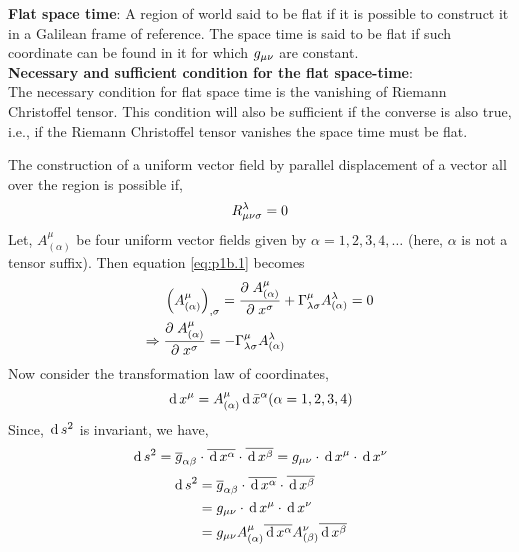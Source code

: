 \documentclass[../main-sheet.tex]{subfiles}
\begin{document}
        \begin{soln}
            \textbf{Flat space time}: A region of world said to be flat if it is possible to construct it in a Galilean frame of reference. The space time is said to be flat if such coordinate can be found in it for which \(g_{\mu\nu}\) are constant.\\

            \textbf{Necessary and sufficient condition for the flat space-time}:\\
            The necessary condition for flat space time is the vanishing of Riemann Christoffel tensor. This condition will also be sufficient if the converse is also true, i.e., if the Riemann Christoffel tensor vanishes the space time must be flat.

            The construction of a uniform vector field by parallel displacement of a vector all over the region is possible if,
            \begin{equation}
                R_{{\mu\nu}\sigma}^\lambda=0\label{eq:p1b.1}
            \end{equation}
            Let, \(A_{(\alpha)}^\mu\) be four uniform vector fields given by \(\alpha=1,2,3,4,\dots\) (here, \(\alpha\) is not a tensor suffix). Then equation \eqref{eq:p1b.1} becomes
            \begin{align}
                & \left( A_{(\alpha)}^\mu \right)_{,\sigma}=\frac{\partial\;A_{(\alpha)}^\mu}{\partial\; x^\sigma}+\Gamma_{\lambda\sigma}^\mu  A_{(\alpha)}^\lambda=0\notag\\
                \Rightarrow\;& \frac{\partial\;A_{(\alpha)}^\mu}{\partial\; x^\sigma}=-\Gamma_{\lambda\sigma}^\mu  A_{(\alpha)}^\lambda\label{eq:1b1.2}
            \end{align}
            Now consider the transformation law of coordinates,
            \[\,\mathrm{d}\, x^\mu=A_{(\alpha)}^\mu\,\mathrm{d}\, \bar{x}^\alpha (\alpha=1,2,3,4)\]
            Since, \(\,\mathrm{d}\, s^2\) is invariant, we have,
            \[
                \,\mathrm{d}\, s^2=\overline{g}_{\alpha\beta} \cdot\overline{\,\mathrm{d}\, x^\alpha}\cdot\overline{\,\mathrm{d}\, x^\beta}=g_{{\mu\nu}} \cdot \,\mathrm{d}\, x^\mu\cdot\,\mathrm{d}\, x^\nu\\
            \]
            \begin{align*}
                \,\mathrm{d}\, s^2&=\overline{g}_{\alpha\beta} \cdot\overline{\,\mathrm{d}\, x^\alpha}\cdot\overline{\,\mathrm{d}\, x^\beta}\\
                &=g_{{\mu\nu}} \cdot \,\mathrm{d}\, x^\mu\cdot\,\mathrm{d}\, x^\nu\\
                &=g_{{\mu\nu}} A_{(\alpha)}^\mu\overline{\,\mathrm{d}\, x^\alpha}A_{(\beta)}^\nu\overline{\,\mathrm{d}\, x^\beta}
            \end{align*}

\end{soln}
\end{document}

